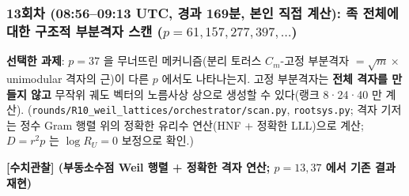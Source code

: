\hypertarget{uxd68cuxcc28-08560913-utc-uxacbduxacfc-169uxbd84-uxbcf8uxc778-uxc9c1uxc811-uxacc4uxc0b0-uxc871-uxc804uxccb4uxc5d0-uxb300uxd55c-uxad6cuxc870uxc801-uxbd80uxbd84uxaca9uxc790-uxc2a4uxce94-p61157277397dots}{%
\subsubsection*{\texorpdfstring{13회차 (08:56--09:13 UTC, 경과 169분, 본인 직접 계산): 족 전체에 대한 구조적 부분격자 스캔 (\(p=61,157,277,397,\dots\))}{13회차 (08:56--09:13 UTC, 경과 169분, 본인 직접 계산): 족 전체에 대한 구조적 부분격자 스캔 (p=61,157,277,397,\textbackslash dots)}}\label{uxd68cuxcc28-08560913-utc-uxacbduxacfc-169uxbd84-uxbcf8uxc778-uxc9c1uxc811-uxacc4uxc0b0-uxc871-uxc804uxccb4uxc5d0-uxb300uxd55c-uxad6cuxc870uxc801-uxbd80uxbd84uxaca9uxc790-uxc2a4uxce94-p61157277397dots}}

\textbf{선택한 과제}: \(p=37\) 을 무너뜨린 메커니즘(분리 토러스 \(C_m\)-고정 부분격자 \(=\sqrt m\times\) unimodular 격자의 근)이 다른 \(p\) 에서도 나타나는지. 고정 부분격자는 \textbf{전체 격자를 만들지 않고} 무작위 궤도 벡터의 노름사상 상으로 생성할 수 있다(랭크 8·24·40 만 계산). (\texttt{rounds/R10\_weil\_lattices/orchestrator/scan.py}, \texttt{rootsys.py}; 격자 기저는 정수 Gram 행렬 위의 정확한 유리수 연산(HNF + 정확한 LLL)으로 계산; \(D=r^2p\) 는 \(\log R_U=0\) 보정으로 확인.)

\textbf{{[}수치관찰{]} (부동소수점 Weil 행렬 + 정확한 격자 연산; \(p=13,37\) 에서 기존 결과 재현)}

